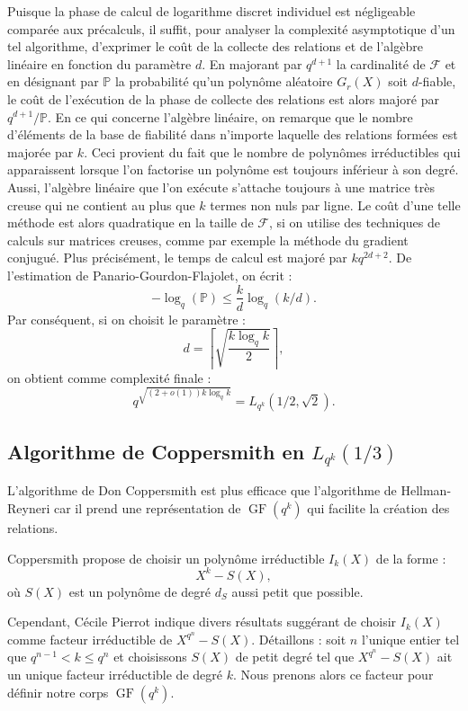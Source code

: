 \documentclass[a4paper, titlepage, 11pt]{article}
\theoremstyle{definition}
\theoremstyle{remark}
\def\o{o}
\def\gf{\operatorname{GF}}
\begin{document}
Puisque la phase de calcul de logarithme discret individuel est négligeable comparée aux précalculs, il suffit, pour analyser la complexité asymptotique d'un tel algorithme, d'exprimer le coût de la collecte des relations et de l'algèbre linéaire en fonction du paramètre $d$. En majorant par $q^{d+1}$ la cardinalité de $\mathcal{F}$ et en désignant par $\mathbb{P}$ la probabilité qu'un polynôme aléatoire $G_r(X)$ soit $d$-fiable, le coût de l'exécution de la phase de collecte des relations est alors majoré par $q^{d+1}/\mathbb{P}$. En ce qui concerne l'algèbre linéaire, on remarque que le nombre d'éléments de la base de fiabilité dans n'importe laquelle des relations formées est majorée par $k$. Ceci provient du fait que le nombre de polynômes irréductibles qui apparaissent lorsque l'on factorise un polynôme est toujours inférieur à son degré. Aussi, l’algèbre linéaire que l'on exécute s'attache toujours à une matrice très creuse qui ne contient au plus que $k$ termes non nuls par ligne. Le coût d'une telle méthode est alors quadratique en la taille de $\mathcal{F}$, si on utilise des techniques de calculs sur matrices creuses, comme par exemple la méthode du gradient conjugué. Plus précisément, le temps de calcul est majoré par $kq^{2d+2}$. De l'estimation de Panario-Gourdon-Flajolet, on écrit :
$$-\log_q(\mathbb{P}) \leqslant\frac{k}{d}\log_q(k/d).$$
Par conséquent, si on choisit le paramètre :
$$d = \left\lceil \sqrt{ \frac{k\log_q k}{2} } \right\rceil,$$
on obtient comme complexité finale :
$$q^{\sqrt{(2+\o(1))k\log_qk}} = L_{q^k}(1/2,\sqrt 2).$$

\subsection{Algorithme de Coppersmith en $L_{q^k}(1/3)$}

L'algorithme de Don Coppersmith \cite{coppersmith1984} est plus efficace que l'algorithme de Hellman-Reyneri car il prend une représentation de $\gf(q^k)$ qui facilite la création des relations.

Coppersmith propose de choisir un polynôme irréductible $I_k(X)$ de la forme : $$X^k - S(X),$$ où $S(X)$ est un polynôme de degré $d_S$ aussi petit que possible. 

Cependant, Cécile Pierrot \cite{pierrot2016} indique divers résultats \cite{joux2006, joux2013} suggérant de choisir $I_k(X)$ comme facteur irréductible de $X^{q^n}-S(X)$. Détaillons : soit $n$ l'unique entier tel que $q^{n-1} < k \leqslant q^n$ et choisissons $S(X)$ de petit degré tel que $X^{q^n}-S(X)$ ait un unique facteur irréductible de degré $k$. Nous prenons alors ce facteur pour définir notre corps $\gf(q^k)$.
\end{document}
